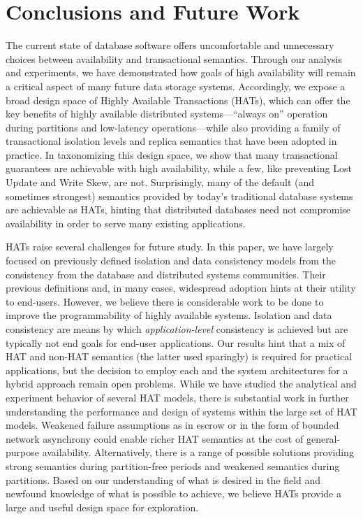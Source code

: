 
\section{Conclusions and Future Work}
\label{sec:conclusion}

The current state of database software offers uncomfortable and
unnecessary choices between availability and transactional semantics.
Through our analysis and experiments, we have demonstrated how goals
of high availability will remain a critical aspect of many future data
storage systems. Accordingly, we expose a broad design space of Highly
Available Transactions (HATs), which can offer the key benefits of
highly available distributed systems---``always on'' operation during
partitions and low-latency operations---while also providing a family
of transactional isolation levels and replica semantics that have been
adopted in practice.  In taxonomizing this design space, we show that
many transactional guarantees are achievable with high availability,
while a few, like preventing Lost Update and Write Skew, are
not. Surprisingly, many of the default (and sometimes strongest)
semantics provided by today's traditional database systems are
achievable as HATs, hinting that distributed databases need not
compromise availability in order to serve many existing applications.

HATs raise several challenges for future study. In this paper, we have
largely focused on previously defined isolation and data consistency
models from the consistency from the database and distributed systems
communities. Their previous definitions and, in many cases, widespread
adoption hints at their utility to end-users. However, we believe
there is considerable work to be done to improve the programmability
of highly available systems. Isolation and data consistency are means
by which \textit{application-level} consistency is achieved but are
typically not end goals for end-user applications. Our results hint
that a mix of HAT and non-HAT semantics (the latter used sparingly) is
required for practical applications, but the decision to employ each
and the system architectures for a hybrid approach remain open
problems. While we have studied the analytical and experiment behavior
of several HAT models, there is substantial work in further
understanding the performance and design of systems within the large
set of HAT models. Weakened failure assumptions as in escrow or in the
form of bounded network asynchrony could enable richer HAT semantics
at the cost of general-purpose availability. Alternatively, there is a
range of possible solutions providing strong semantics during
partition-free periods and weakened semantics during partitions. Based
on our understanding of what is desired in the field and newfound
knowledge of what is possible to achieve, we believe HATs provide a
large and useful design space for exploration.

